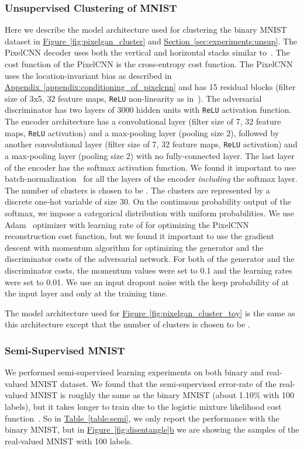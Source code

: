 \documentclass{article}
\newcommand{\mysec}[1]{\hyperref[sec:#1]{Section~\ref*{sec:#1}}}
\newcommand{\mytable}[1]{\hyperref[table:#1]{Table~\ref*{table:#1}}}
\newcommand{\myfig}[1]{\hyperref[fig:#1]{Figure~\ref*{fig:#1}}}
\newcommand{\myfigg}[2]{\hyperref[fig:#1]{Figure~\ref*{fig:#1}#2}}
\newcommand{\myappendix}[1]{\hyperref[appendix:#1]{Appendix~\ref*{appendix:#1}}}
\begin{document}
\begin{appendices}
\subsubsection{Unsupervised Clustering of MNIST}\label{appendix:cluster-mnist}
Here we describe the model architecture used for clustering the binary MNIST dataset in \myfig{pixelgan_cluster} and \mysec{experiments:unsup}. The PixelCNN decoder uses both the vertical and horizontal stacks similar to~\citep{pixelcnn}. The cost function of the PixelCNN is the cross-entropy cost function. 
The PixelCNN uses the location-invariant bias as described in \myappendix{conditioning_of_pixelcnn} and has 15 residual blocks (filter size of 3x5, 32 feature maps, \texttt{ReLU} non-linearity as in~\citep{pixelcnn}). The adversarial discriminator has two layers of 3000 hidden units with \texttt{ReLU} activation function. 
The encoder architecture has a convolutional layer (filter size of 7, 32 feature maps, \texttt{ReLU} activation) and a max-pooling layer (pooling size 2), followed by another convolutional layer (filter size of 7, 32 feature maps, \texttt{ReLU} activation) and a max-pooling layer (pooling size 2) with no fully-connected layer. 
The last layer of the encoder  has the softmax activation function. We found it important to use batch-normalization~\citep{batch} for all the layers of the encoder \emph{including} the softmax layer. 
The number of clusters is chosen to be . The clusters are represented by a discrete one-hot variable of size 30. On the continuous probability output of the softmax, we impose a categorical distribution with uniform probabilities. 
We use Adam~\citep{Adam} optimizer with learning rate of  for optimizing the PixelCNN reconstruction cost function, but we found it important to use the gradient descent with momentum algorithm for optimizing the generator and the discriminator costs of the adversarial network. 
For both of the generator and the discriminator costs, the momentum values were set to 0.1 and the learning rates were set to 0.01. 
We use an input dropout noise with the keep probability of  at the input layer and only at the training time. 

The model architecture used for \myfig{pixelgan_cluster_toy} is the same as this architecture except that the number of clusters is chosen to be .


\subsubsection{Semi-Supervised MNIST}\label{appendix:semi-mnist}
We performed semi-supervised learning experiments on both binary and real-valued MNIST dataset. We found that the semi-supervised error-rate of the real-valued MNIST is roughly the same as the binary MNIST (about 1.10\% with 100 labels), but it takes longer to train due to the logistic mixture likelihood cost function~\citep{pixelcnn++}. So in \mytable{semi}, we only report the performance with the binary MNIST, but in \myfigg{disentangle}{b} we are showing the samples of the real-valued MNIST with 100 labels.


\end{appendices}
\end{document}
